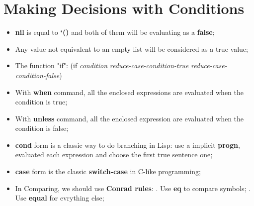 \section{Making Decisions with Conditions}

\begin{itemize}
\item \textbf{nil} is equal to \textbf{`()} and both of them will be evaluating as a \textbf{false};
\item Any value not equivalent to an empty list will be considered as a true value;
\item The function "if":
  \subitem (if \textit{condition} \textit{reduce-case-condition-true} \textit{reduce-case-condition-false})
\item With \textbf{when} command, all the enclosed expressions are evaluated when the condition is true;
\item With \textbf{unless} command, all the enclosed expression are evaluated when the condition is false;
\item \textbf{cond} form is a classic way to do branching in Lisp:
  \subitem use a implicit \textbf{progn}, evaluated each expression and choose the first true sentence one;
\item \textbf{case} form is the classic \textbf{switch-case} in C-like programming;
\item In Comparing, we should use \textbf{Conrad rules}:
  . Use \textbf{eq} to compare symbols;
  . Use \textbf{equal} for evrything else;
\end{itemize}
